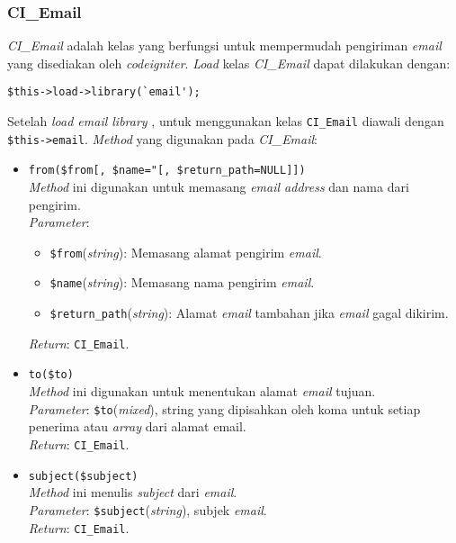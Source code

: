  
\subsubsection{CI\_Email}
\textit{CI\_Email} adalah kelas yang berfungsi untuk mempermudah pengiriman \textit{email} yang disediakan oleh \textit{codeigniter}. \textit{Load} kelas \textit{CI\_Email} dapat dilakukan dengan:
\begin{lstlisting}
$this->load->library(`email');
\end{lstlisting}
Setelah \textit{load email library} , untuk menggunakan kelas \texttt{CI\_Email} diawali dengan \texttt{\$this->email}. \textit{Method} yang digunakan pada \textit{CI\_Email}:

\begin{itemize}
	\item \texttt{from(\$from[, \$name="[, \$return\_path=NULL]])} \\
	\textit{Method} ini digunakan untuk memasang \textit{email address} dan nama dari pengirim. \\ 
	\textit{Parameter}:
	\begin{itemize}
		\item \texttt{\$from}(\textit{string}): Memasang alamat pengirim \textit{email}.
		\item \texttt{\$name}(\textit{string}): Memasang nama pengirim \textit{email}.
		\item \texttt{\$return\_path}(\textit{string}): Alamat \textit{email} tambahan jika \textit{email} gagal dikirim.
	\end{itemize}
	\textit{Return}: \texttt{CI\_Email}.
	
	\item \texttt{to(\$to)} \\
	\textit{Method} ini digunakan untuk menentukan alamat \textit{email} tujuan. \\
	\textit{Parameter}: \texttt{\$to}(\textit{mixed}), string yang dipisahkan oleh koma untuk setiap penerima atau \textit{array} dari alamat email. \\
	\textit{Return}: \texttt{CI\_Email}.
	
	\item \texttt{subject(\$subject)} \\ 
	\textit{Method} ini menulis \textit{subject} dari \textit{email}. \\
	\textit{Parameter}: \texttt{\$subject}(\textit{string}), subjek \textit{email}. \\
	\textit{Return}: \texttt{CI\_Email}.
	

\end{itemize}
